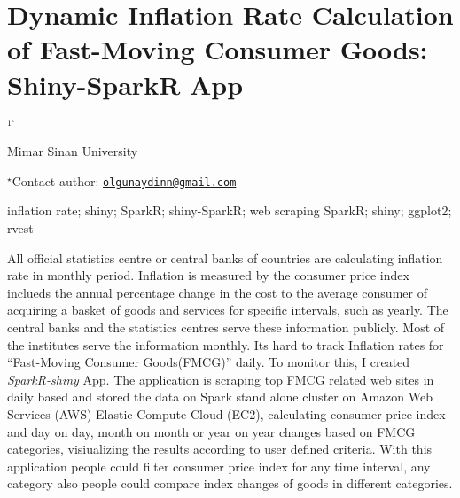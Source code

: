 \documentclass[\main/boa.tex]{subfiles}
\begin{document}
\section{Dynamic Inflation Rate Calculation of Fast-Moving Consumer Goods:
Shiny-SparkR App}

\begin{center}
  {\bf {}$^{1^\star}$}
\end{center}

\vskip 0.3cm

\begin{affiliations}
\begin{enumerate}
\begin{minipage}{0.915\textwidth}
\centering
\item Mimar Sinan University \\[-2pt]
\end{minipage}
\end{enumerate}
$^\star$Contact author: \href{mailto:olgunaydinn@gmail.com}{\nolinkurl{olgunaydinn@gmail.com}}\\
\end{affiliations}

\vskip 0.5cm

\begin{minipage}{0.915\textwidth}
\keywords inflation rate; shiny; SparkR; shiny-SparkR; web scraping
\packages SparkR; shiny; ggplot2; rvest
\end{minipage}

\vskip 0.8cm

All official statistics centre or central banks of countries are
calculating inflation rate in monthly period. Inflation is measured by
the consumer price index inclueds the annual percentage change in the
cost to the average consumer of acquiring a basket of goods and services
for specific intervals, such as yearly. The central banks and the
statistics centres serve these information publicly. Most of the
institutes serve the information monthly. Its hard to track Inflation
rates for ``Fast-Moving Consumer Goods(FMCG)'' daily. To monitor this, I
created \emph{SparkR-shiny} App. The application is scraping top FMCG
related web sites in daily based and stored the data on Spark stand
alone cluster on Amazon Web Services (AWS) Elastic Compute Cloud (EC2),
calculating consumer price index and day on day, month on month or year
on year changes based on FMCG categories, visiualizing the results
according to user defined criteria. With this application people could
filter consumer price index for any time interval, any category also
people could compare index changes of goods in different categories.
\end{document}
